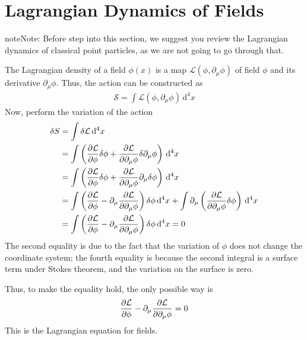 \documentclass[letterpaper,10pt,english]{sphinxmanual}
\begin{document}
\section{Lagrangian Dynamics of Fields}
\label{\detokenize{bg_lag_dyn:lagrangian-dynamics-of-fields}}\label{\detokenize{bg_lag_dyn::doc}}
\begin{sphinxadmonition}{note}{Note:}
Before step into this section, we suggest you review the Lagrangian dynamics of classical point particles, as we are not going to go through that.
\end{sphinxadmonition}

The Lagrangian density of a field \(\phi(x)\) is a map \(\mathcal L(\phi,\partial_\mu\phi)\) of field \(\phi\) and its derivative \(\partial_\mu\phi\). Thus, the action can be constructed as
\begin{equation*}
\begin{split}\mathcal S = \int \mathcal L(\phi,\partial_\mu\phi)\,\mathrm d^4x\end{split}
\end{equation*}
Now, perform the variation of the action
\begin{equation*}
\begin{split}\delta S &= \int \delta\mathcal L \,\mathrm d^4x\\
&= \int \left({\partial\mathcal L\over \partial \phi}\delta\phi + {\partial\mathcal L\over\partial\partial_\mu\phi}\delta\partial_\mu\phi\right)\,\mathrm d^4x\\
&= \int \left({\partial\mathcal L\over \partial \phi}\delta\phi + {\partial\mathcal L\over\partial\partial_\mu\phi}\partial_\mu\delta\phi\right)\,\mathrm d^4x\\
&= \int \left({\partial\mathcal L\over \partial \phi} - \partial_\mu {\partial\mathcal L\over\partial\partial_\mu\phi}\right)\delta\phi\,\mathrm d^4x + \int \partial_\mu \left({\partial\mathcal L\over\partial\partial_\mu\phi}\delta\phi\right)\,\mathrm d^4x\\
&= \int \left({\partial\mathcal L\over \partial \phi} - \partial_\mu {\partial\mathcal L\over\partial\partial_\mu\phi}\right)\delta\phi\,\mathrm d^4x = 0\end{split}
\end{equation*}
The second equality is due to the fact that the variation of \(\phi\) does not change the coordinate system; the fourth equality is because the second integral is a surface term under Stokes theorem, and the variation on the surface is zero.

Thus, to make the equality hold, the only possible way is
\begin{equation*}
\begin{split}{\partial\mathcal L\over \partial \phi} - \partial_\mu {\partial\mathcal L\over\partial\partial_\mu\phi} = 0\end{split}
\end{equation*}
This is the Lagrangian equation for fields.
\end{document}

